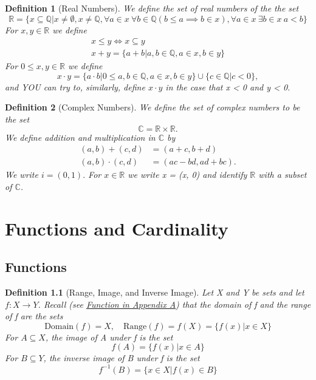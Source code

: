 \documentclass[11pt, oneside]{book}
\theoremstyle{break}
\newtheorem{defn}{Definition}[section]
\newcommand{\bb}[1]{\mathbb{#1}}		%
\begin{document}
\begin{defn}[Real Numbers]
	We define the set of real numbers of the the set
	\[
		\bb{R} = \{x \subseteq \bb{Q} | x \neq \emptyset, x \neq \bb{Q}, \forall a \in x \> \forall b \in \bb{Q}(b \leq a \implies b \in x), \forall a \in x \> \exists b \in x \> a < b \}
	\]
	For $x, y \in \bb{R}$ we define
	\begin{gather*}
		x \leq y \iff x \subseteq y \\
		x + y = \{ a + b | a, b \in \bb{Q}, a \in x, b \in y\}
	\end{gather*}
	For $0 \leq x, y \in \bb{R}$ we define
	\[
		x \cdot y = \{ a \cdot b | 0 \leq a, b \in \bb{Q}, a \in x, b \in y\} \cup \{c \in \bb{Q} | c < 0\},
	\]
	and YOU can try to, similarly, define $x \cdot y$ in the case that x < 0 and y < 0.
\end{defn}

\begin{defn}[Complex Numbers]
	We define the set of complex numbers to be the set
	\[
		\bb{C} = \bb{R} \times \bb{R}.
	\]
	We define addition and multiplication in $\bb{C}$ by
	\begin{align*}
		(a, b) + (c, d) &= (a + c, b + d) \\
		(a, b) \cdot (c, d) &= (ac - bd, ad + bc).
	\end{align*}
	We write $i = (0, 1).$ For $x \in \bb{R}$ we write x = (x, 0) and identify $\bb{R}$ with a subset of $\bb{C}$.
\end{defn}



\chapter{Functions and Cardinality}


\section{Functions}
\begin{defn}[Range, Image, and Inverse Image]
	Let X and Y be sets and let $f: X \to Y$. Recall (see \hyperref[fn_apdxA]{Function in Appendix A}) that the domain of f and the range of f are the sets
	\[
		\text{Domain}(f) = X, \quad \text{Range}(f) = f(X) = \{f(x) | x \in X\}
	\]
	For $A \subseteq X$, the image of A under f is the set
	\[
		f(A) = \{f(x) | x \in A\}
	\]
	For $B \subseteq Y$, the inverse image of B under f is the set
	\[
		f^{-1}(B) = \{x \in X | f(x) \in B\}
	\]
\end{defn}
\end{document}
